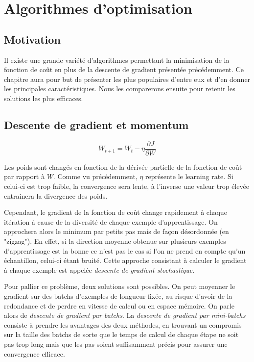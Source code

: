 \chapter{Algorithmes d'optimisation}
\section{Motivation}
Il existe une grande variété d'algorithmes permettant la minimisation de la fonction de coût en plus de la descente de gradient présentée précédemment. Ce chapitre aura pour but de présenter les plus populaires d'entre eux et d'en donner les principales caractéristiques. Nous les comparerons ensuite pour retenir les solutions les plus efficaces.

\section{Descente de gradient et momentum}
\begin{equation}
W_{t+1} = W_t - \eta\frac{\partial J}{\partial W}
\end{equation} 

Les poids sont changés en fonction de la dérivée partielle de la fonction de coût par rapport à $W$. Comme vu précédemment, $\eta$ représente le learning rate. Si celui-ci est trop faible, la convergence sera lente, à l'inverse une valeur trop élevée entrainera la divergence des poids.

Cependant, le gradient de la fonction de coût change rapidement à chaque itération à cause de la diversité de chaque exemple d'apprentissage. On approchera alors le minimum par petits pas mais de façon désordonnée (en "zigzag"). En effet, si la direction moyenne obtenue sur plusieurs exemples d'apprentissage est la bonne ce n'est pas le cas si l'on ne prend en compte qu'un échantillon, celui-ci étant bruité. Cette approche consistant à calculer le gradient à chaque exemple est appelée \textit{descente de gradient stochastique}.

Pour pallier ce problème, deux solutions sont possibles. On peut moyenner le gradient sur des batchs d'exemples de longueur fixée, au risque d'avoir de la redondance et de perdre en vitesse de calcul ou en espace mémoire. On parle alors de \textit{descente de gradient par batchs}. La \textit{descente de gradient par mini-batchs} consiste à prendre les avantages des deux méthodes, en trouvant un compromis sur la taille des batchs de sorte que le temps de calcul de chaque étape ne soit pas trop long mais que les pas soient suffisamment précis pour assurer une convergence efficace.

